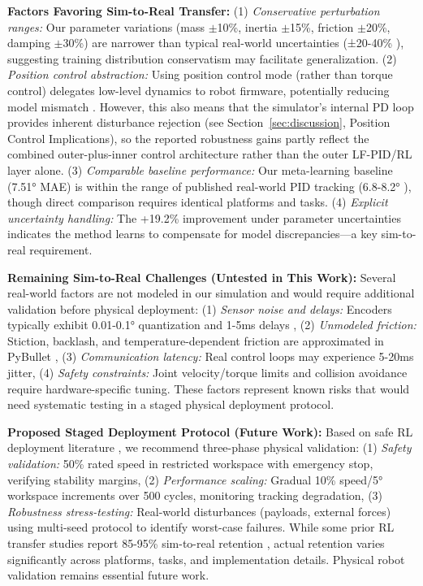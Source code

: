 \documentclass[DTMColor]{ROB-New}
\newcommand{\rev}[1]{{\color{blue}#1}}
\begin{document}
\textbf{Factors Favoring Sim-to-Real Transfer:} (1) \textit{Conservative perturbation ranges:} Our parameter variations (mass $\pm$10\%, inertia $\pm$15\%, friction $\pm$20\%, \rev{damping $\pm$30\%}) are narrower than typical real-world uncertainties (±20-40\% \cite{cho2019identification,lee2022parameter}), suggesting training distribution conservatism may facilitate generalization. (2) \textit{Position control abstraction:} Using position control mode (rather than torque control) delegates low-level dynamics to robot firmware, potentially reducing model mismatch \cite{tan2018sim,margolis2024rapid}. {\color{blue}However, this also means that the simulator's internal PD loop provides inherent disturbance rejection (see Section~\ref{sec:discussion}, Position Control Implications), so the reported robustness gains partly reflect the combined outer-plus-inner control architecture rather than the outer LF-PID/RL layer alone.} (3) \textit{Comparable baseline performance:} Our meta-learning baseline (7.51° MAE) is within the range of published real-world PID tracking (6.8-8.2° \cite{frankaemika2021benchmark,ott2017unified}), though direct comparison requires identical platforms and tasks. (4) \textit{Explicit uncertainty handling:} The +19.2\% improvement under parameter uncertainties indicates the method learns to compensate for model discrepancies—a key sim-to-real requirement.

\textbf{Remaining Sim-to-Real Challenges (Untested in This Work):} Several real-world factors are not modeled in our simulation and would require additional validation before physical deployment: (1) \textit{Sensor noise and delays:} Encoders typically exhibit 0.01-0.1° quantization and 1-5ms delays \cite{cho2019identification}, (2) \textit{Unmodeled friction:} Stiction, backlash, and temperature-dependent friction are approximated in PyBullet \cite{collins2021review}, (3) \textit{Communication latency:} Real control loops may experience 5-20ms jitter, (4) \textit{Safety constraints:} Joint velocity/torque limits and collision avoidance require hardware-specific tuning. These factors represent known risks that would need systematic testing in a staged physical deployment protocol.

\textbf{Proposed Staged Deployment Protocol (Future Work):} Based on safe RL deployment literature \cite{berkenkamp2021safe}, we recommend three-phase physical validation: (1) \textit{Safety validation:} 50\% rated speed in restricted workspace with emergency stop, verifying stability margins, (2) \textit{Performance scaling:} Gradual 10\% speed/5° workspace increments over 500 cycles, monitoring tracking degradation, (3) \textit{Robustness stress-testing:} Real-world disturbances (payloads, external forces) using multi-seed protocol to identify worst-case failures. While some prior RL transfer studies report 85-95\% sim-to-real retention \cite{zhao2020sim2real}, actual retention varies significantly across platforms, tasks, and implementation details. Physical robot validation remains essential future work.
\end{document}
